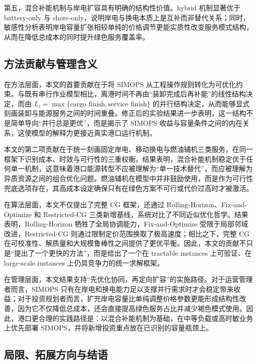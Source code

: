 \documentclass[UTF8, a4paper, 12pt]{ctexart}
\begin{document}
第五，混合补能机制与岸电扩容具有明确的结构性价值。hybrid 机制显著优于 battery-only 与 shore-only，说明岸电与换电本质上是互补而非替代关系；同时，敏感性分析表明岸电容量扩张相较单纯的价格调节更能实质性改变服务模式结构，从而在降低总成本的同时提升绿色服务覆盖率。

\subsection{方法贡献与管理含义}
\label{sec:contributions}

在方法层面，本文的首要贡献在于将 SIMOPS 从工程操作规则转化为可优化约束。与既有串行作业模型相比\cite{Dai2020,Zou2024}，离港时间不再由“装卸完成后再补能”的线性结构决定，而由 $L_i=\max\{\text{cargo finish},\text{service finish}\}$ 的并行结构决定，从而能够显式刻画装卸与能源服务之间的时间重叠。修正后的实验结果进一步表明，这一结构不是简单导向“并行总是更优”，而是揭示了 SIMOPS 收益与容量条件之间的内在关系，这使模型的解释力更接近真实港口运行机制。

本文的第二项贡献在于统一刻画固定岸电、移动换电与燃油辅机三类服务，在同一框架下识别成本、时效与可行性的三重权衡。结果表明，混合补能机制稳定优于任何单一机制，这意味着港口能源转型不应被理解为“单一技术替代”，而应被理解为异质资源之间的组合优化问题。燃油辅机在模型中并非鼓励使用，而是作为可行性兜底选项存在，其高成本设定确保只有在绿色方案不可行或代价过高时才被激活。

在算法层面，本文不仅提出了完整 CG 框架，还通过 Rolling-Horizon、Fix-and-Optimize 和 Restricted-CG 三类新增基线，系统对比了不同近似优化哲学。结果表明，Rolling-Horizon 牺牲了全局协调能力，Fix-and-Optimize 受限于局部邻域改进，Restricted-CG 则通过限制定价范围换取了极高速度；相比之下，完整 CG 在可校准性、解质量和大规模鲁棒性之间提供了更优平衡。因此，本文的贡献不只是“提出了一个更快的方法”，而是给出了一个在 tractable instances 上可验证、在 large-scale instances 上仍具竞争力的统一求解框架。

在管理层面，本文结果支持“先优化协同，再定向扩容”的实施路径。对于运营管理者而言，SIMOPS 只有在岸电和换电能力足以支撑并行需求时才会稳定带来收益；对于投资规划者而言，扩充岸电容量比单纯调整价格参数更能形成结构性改善，因为它不仅降低总成本，还会直接提高绿色服务占比并减少褐色模式使用。因此，港口更合理的实践路径是：以混合补能机制为基础，在中等负载或高时敏业务上优先部署 SIMOPS，并将新增投资重点放在已识别的容量瓶颈上。

\subsection{局限、拓展方向与结语}
\label{sec:limitations}
\end{document}
